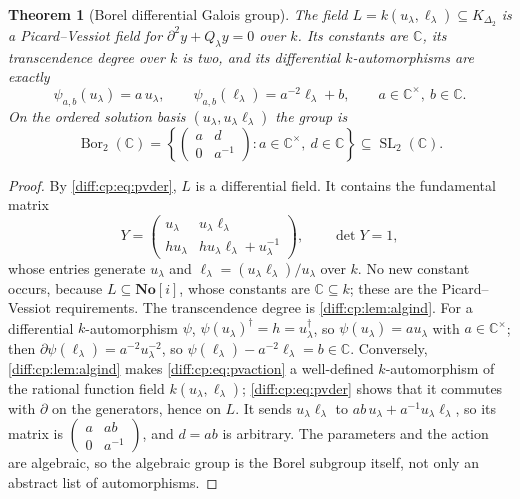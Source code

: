 \documentclass[11pt,letterpaper]{article}
\numberwithin{equation}{section}
\newtheorem{theorem}{Theorem}[section]
\theoremstyle{definition}
\theoremstyle{remark}
\newcommand{\SC}{\mathbf{No}[i]}
\newcommand{\C}{\mathbb C}
\newcommand{\der}{\partial}
\newcommand{\SL}{\operatorname{SL}}
\newcommand{\Bor}{\operatorname{Bor}}
\begin{document}
\begin{theorem}[Borel differential Galois group]
\label{diff:cp:thm:pv}
The field $L=k(u_{\lambda},\ell_{\lambda})\subseteq K_{\Delta_{2}}$ is a
Picard--Vessiot field for $\der^{2}y+Q_{\lambda}y=0$ over $k$. Its constants are
$\C$, its transcendence degree over $k$ is two, and its differential
$k$-automorphisms are exactly
\begin{equation}\label{diff:cp:eq:pvaction}
 \psi_{a,b}(u_{\lambda})=a\,u_{\lambda},\qquad
 \psi_{a,b}(\ell_{\lambda})=a^{-2}\ell_{\lambda}+b,
 \qquad a\in\C^{\times},\ b\in\C .
\end{equation}
On the ordered solution basis $(u_{\lambda},u_{\lambda}\ell_{\lambda})$ the group
is
\begin{equation}\label{diff:cp:eq:borel}
 \Bor_{2}(\C)=\left\{\begin{pmatrix}a&d\\0&a^{-1}\end{pmatrix}:
 a\in\C^{\times},\ d\in\C\right\}\subseteq\SL_{2}(\C).
\end{equation}
\end{theorem}
\begin{proof}
By \cref{diff:cp:eq:pvder}, $L$ is a differential field. It contains the
fundamental matrix
\[
 Y=\begin{pmatrix}u_{\lambda}&u_{\lambda}\ell_{\lambda}\\
 hu_{\lambda}&hu_{\lambda}\ell_{\lambda}+u_{\lambda}^{-1}\end{pmatrix},
 \qquad \det Y=1,
\]
whose entries generate $u_{\lambda}$ and $\ell_{\lambda}=(u_{\lambda}\ell_{\lambda})/u_{\lambda}$
over $k$. No new constant occurs, because $L\subseteq\SC$, whose constants are
$\C\subseteq k$; these are the Picard--Vessiot requirements. The transcendence
degree is \cref{diff:cp:lem:algind}. For a differential $k$-automorphism
$\psi$, $\psi(u_{\lambda})^{\dagger}=h=u_{\lambda}^{\dagger}$, so
$\psi(u_{\lambda})=au_{\lambda}$ with $a\in\C^{\times}$; then
$\der\psi(\ell_{\lambda})=a^{-2}u_{\lambda}^{-2}$, so
$\psi(\ell_{\lambda})-a^{-2}\ell_{\lambda}=b\in\C$. Conversely,
\cref{diff:cp:lem:algind} makes \cref{diff:cp:eq:pvaction} a well-defined
$k$-automorphism of the rational function field $k(u_{\lambda},\ell_{\lambda})$;
\cref{diff:cp:eq:pvder} shows that it commutes with $\der$ on the generators,
hence on $L$. It sends $u_{\lambda}\ell_{\lambda}$ to
$ab\,u_{\lambda}+a^{-1}u_{\lambda}\ell_{\lambda}$, so its matrix is
$\left(\begin{smallmatrix}a&ab\\0&a^{-1}\end{smallmatrix}\right)$, and $d=ab$ is
arbitrary. The parameters and the action are algebraic, so the algebraic group
is the Borel subgroup itself, not only an abstract list of automorphisms.
\end{proof}
\end{document}
